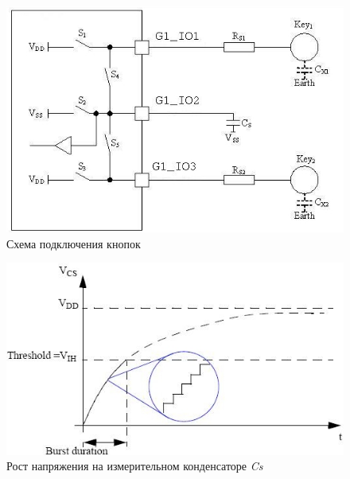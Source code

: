 \begin{figure}[H]
\begin{center}
\includegraphics[scale=0.5]{Image/57.jpg} 
\end{center}
\caption{Схема подключения кнопок}
\end{figure}

\begin{figure}[H]
\begin{center}
\includegraphics[scale=0.7]{Image/58.jpg} 
\end{center}
\caption{Рост напряжения на измерительном конденсаторе \textit{Cs}}
\end{figure}



